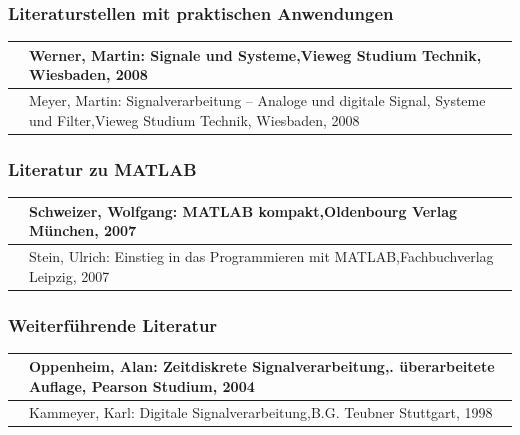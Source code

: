 \subsubsection{Literaturstellen mit praktischen Anwendungen}

\begin{tabular}{|p{0.6in}|p{5.7in}|} \hline 
[Wern08] & Werner, Martin: Signale und Systeme,\newline Vieweg Studium Technik, Wiesbaden, 2008 \\ \hline 
[Meye08] & Meyer, Martin: Signalverarbeitung -- Analoge und digitale Signal, Systeme und Filter,\newline Vieweg Studium Technik, Wiesbaden, 2008 \\ \hline 
\end{tabular}


\subsubsection{Literatur zu MATLAB}

\begin{tabular}{|p{0.6in}|p{5.7in}|} \hline 
[Schw07] & Schweizer, Wolfgang: MATLAB kompakt,\newline Oldenbourg Verlag M\"{u}nchen, 2007 \\ \hline 
[Stei07] & Stein, Ulrich: Einstieg in das Programmieren mit MATLAB,\newline Fachbuchverlag Leipzig, 2007 \\ \hline 
\end{tabular}


\subsubsection{Weiterf\"{u}hrende Literatur}

\begin{tabular}{|p{0.6in}|p{5.7in}|} \hline 
[Oppe04] & Oppenheim, Alan: Zeitdiskrete Signalverarbeitung,\newline 2. \"{u}berarbeitete Auflage, Pearson Studium, 2004 \\ \hline 
[Kamm98] & Kammeyer, Karl: Digitale Signalverarbeitung,\newline B.G. Teubner Stuttgart, 1998 \\ \hline 
\end{tabular}